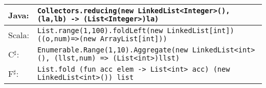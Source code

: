 \documentclass[paper.tex]{subfiles}
\begin{document}
\begin{tabular}{lL{12cm}}
Java: & \texttt{Collectors.reducing(new LinkedList<Integer>(), (la,lb) -> (List<Integer>)la)}\\
\hline
Scala:&\texttt{List.range(1,100).foldLeft(new LinkedList[int])((o,num)=>(new ArrayList[int]))}\\
\hline
C$^\sharp$: & \texttt{Enumerable.Range(1,10).Aggregate(new LinkedList<int>(), (llst,num) => (List<int>)llst)}\\
\hline
F$^\sharp$: & \texttt{List.fold (fun acc elem -> List<int> acc) (new LinkedList<int>()) list}\\
\end{tabular}
\end{document}

